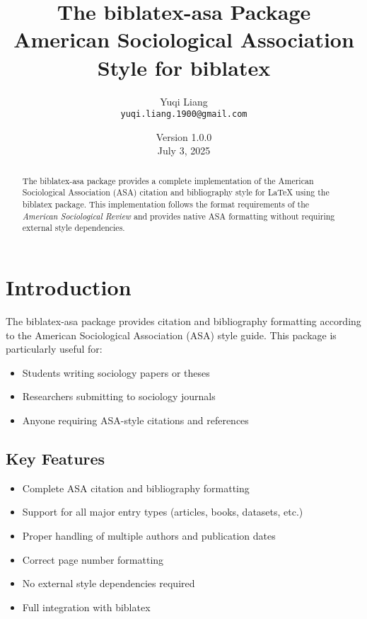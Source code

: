 \documentclass[11pt,a4paper]{ltxdoc}
\title{The \textsf{biblatex-asa} Package\\
       \Large American Sociological Association Style for \textsf{biblatex}}
\author{Yuqi Liang\\
        \texttt{yuqi.liang.1900@gmail.com}}
\date{Version 1.0.0\\July 3, 2025}
\begin{document}
\maketitle

\begin{abstract}
The \textsf{biblatex-asa} package provides a complete implementation of the American Sociological Association (ASA) citation and bibliography style for LaTeX using the \textsf{biblatex} package. This implementation follows the format requirements of the \emph{American Sociological Review} and provides native ASA formatting without requiring external style dependencies.
\end{abstract}

\tableofcontents

\section{Introduction}

The \textsf{biblatex-asa} package provides citation and bibliography formatting according to the American Sociological Association (ASA) style guide. This package is particularly useful for:

\begin{itemize}
  \item Students writing sociology papers or theses
  \item Researchers submitting to sociology journals
  \item Anyone requiring ASA-style citations and references
\end{itemize}

\subsection{Key Features}

\begin{itemize}
  \item Complete ASA citation and bibliography formatting
  \item Support for all major entry types (articles, books, datasets, etc.)
  \item Proper handling of multiple authors and publication dates
  \item Correct page number formatting
  \item No external style dependencies required
  \item Full integration with \textsf{biblatex}
\end{itemize}
\end{document}
